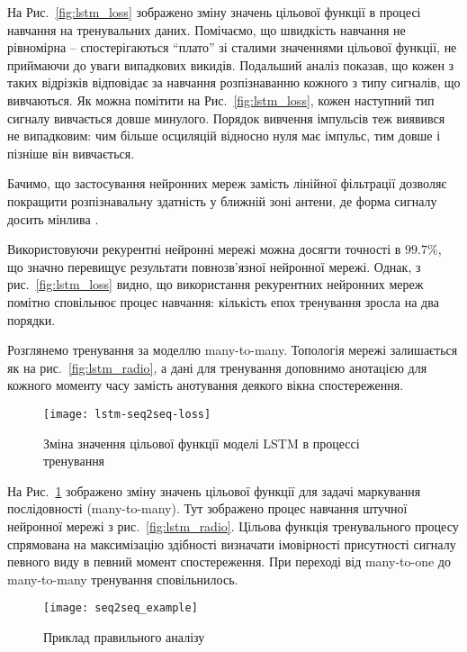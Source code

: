 На Рис.~\ref{fig:lstm_loss} зображено зміну значень цільової функції в процесі
навчання на тренувальних даних. Помічаємо, що швидкість навчання 
не рівномірна -- спостерігаються ``плато'' зі сталими значеннями цільової 
функції, не приймаючи до уваги випадкових викидів. Подальший аналіз показав, 
що кожен з таких відрізків відповідає за навчання розпізнаванню кожного з 
типу сигналів, що вивчаються. Як можна помітити на Рис.~\ref{fig:lstm_loss},
кожен наступний тип сигналу вивчається довше минулого. Порядок вивчення 
імпульсів теж виявився не випадковим: чим більше осциляцій відносно нуля має 
імпульс, тим довше і пізніше він вивчається.

Бачимо, що застосування нейронних мереж замість лінійної фільтрації 
дозволяє покращити розпізнавальну здатність у ближній зоні антени, де форма 
сигналу досить мінлива \cite{my:UWBUSIS2018}.

Використовуючи рекурентні нейронні мережі можна досягти точності в 
$ 99.7\% $, що значно перевищує результати повнозв'язної нейронної мережі. 
Однак, з рис.~\ref{fig:lstm_loss} видно, що використання рекурентних 
нейронних мереж помітно сповільнює процес навчання: кількість епох 
тренування зросла на два порядки.

Розглянемо тренування за моделлю many-to-many. Топологія мережі залишається 
як на рис.~\ref{fig:lstm_radio}, а дані для тренування доповнимо анотацією 
для кожного моменту часу замість анотування деякого вікна спостереження.

\begin{figure}[htbp] \begin{center}
\texttt{[image: lstm-seq2seq-loss]}
\caption{Зміна значення цільової функції моделі LSTM
в процессі тренування} \label{fig:lstm_seq2seq_loss}
\end{center} \end{figure}

На Рис.~\ref{fig:lstm_seq2seq_loss} зображено зміну значень цільової функції
для задачі маркування послідовності (many-to-many). Тут зображено процес 
навчання штучної нейронної мережі з рис.~\ref{fig:lstm_radio}. Цільова
функція тренувального процесу спрямована на максимізацію здібності визначати
імовірності присутності сигналу певного виду в певний момент спостереження.
При переході від many-to-one до many-to-many тренування сповільнилось.

\begin{figure}[htbp] \begin{center}
\texttt{[image: seq2seq\_example]}
\caption{Приклад правильного аналізу} \label{fig:seq2seq_example}
\end{center} \end{figure}

